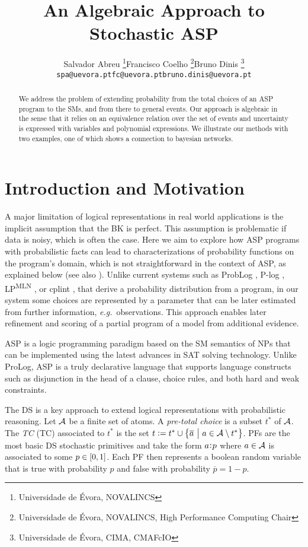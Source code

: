 \documentclass[a4paper, 10pt]{article}
\title{An Algebraic Approach to Stochastic ASP}
\author{
\begin{tabular}{ccc}
    Salvador Abreu
    \footnote{Universidade de Évora, NOVALINCS}
    &
    Francisco Coelho
    \footnote{Universidade de Évora, NOVALINCS, High Performance Computing Chair}
    & Bruno Dinis
    \footnote{Universidade de Évora, CIMA, CMAFcIO}
    \\
    \texttt{spa@uevora.pt}
    & \texttt{fc@uevora.pt}
    & \texttt{bruno.dinis@uevora.pt}
\end{tabular}
}
\newcommand{\co}[1]{\ensuremath{\overline{#1}}}
\newcommand{\fml}[1]{\ensuremath{{\cal #1}}}
\newcommand{\given}{\ensuremath{~\middle|~}}
\newcommand{\probfact}[2]{\ensuremath{#2\mkern-4mu:\mkern-4mu#1}}
\begin{document}
%
%
%
\maketitle
%
%
%
\begin{abstract}
    We address the problem of extending probability from the total choices of an \acs{ASP} program to the \aclp{SM}, and from there to general events.
    Our approach is algebraic in the sense that it relies on an equivalence relation over the set of events and uncertainty is expressed with variables and polynomial expressions.
    We illustrate our methods with two examples, one of which shows a connection to bayesian networks.
\end{abstract}
%
%
%
\section{Introduction and Motivation}
%
%
%
A major limitation of logical representations in real world applications is the implicit assumption that the \acl{BK} is perfect. This assumption is problematic if data is noisy, which is often the case. Here we aim to explore how \acl{ASP} programs with probabilistic facts can lead to characterizations of probability functions on the program's domain, which is not straightforward in the context of \acl{ASP}, as explained below (see also \cite{cozman2020joy,verreet2022inference,baral2009probabilistic,pajunen2021solution}). Unlike current systems such as ProbLog \cite{de2007problog}, P-log \cite{baral2009probabilistic}, LP\textsuperscript{MLN} \cite{lee2016weighted}, or cplint \cite{alberti2017cplint}, that derive a probability distribution from a program, in our system some choices are represented by a parameter that can be later estimated from further information, \emph{e.g.}\ observations. This approach enables later refinement and scoring of a partial program of a model from additional evidence.

\Ac{ASP} \cite{lifschitz2002answer} is a logic programming paradigm based on the \ac{SM} semantics of \acp{NP} that can be implemented using the latest advances in SAT solving technology. Unlike ProLog, \ac{ASP} is a truly declarative language that supports language constructs such as disjunction in the head of a clause, choice rules, and both hard and weak constraints.

The \ac{DS} \cite{sato1995statistical,riguzzi2022foundations} is a key approach to extend logical representations with probabilistic reasoning. 
%
Let $\fml{A}$ be a finite set of atoms. A \emph{pre-total choice} is a subset $t^{\ast}$ of \fml{A}. The \emph{\acl{TC}} (TC) associated to $t^{\ast}$ is the set $t := t^{\ast} \cup \set{\co{a} \given a \in \fml{A} \setminus t^{\ast}}$. \Acp{PF} are the most basic \ac{DS} stochastic primitives and take the form  $\probfact{p}{a}$ where $a\in\fml{A}$ is associated to some $p\in\intcc{0, 1}$. Each \ac{PF} then represents a boolean random variable that is true with probability $p$ and false with probability $\co{p} = 1 - p$.
\end{document}
